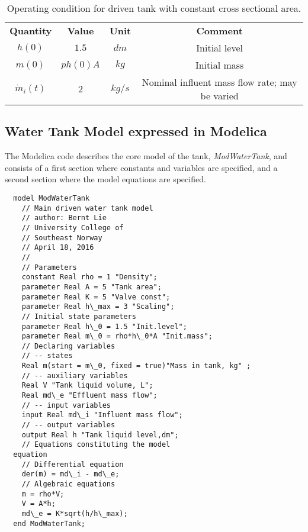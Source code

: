 \begin{table} [!h]
	\begin{center}
		\caption{Operating condition for driven tank with constant cross sectional area.} 
		\label{tab:tablemodeloperatingconditions} 
		\begin{tabular}{ cccc } 
			\hline
			\bfseries Quantity & \bfseries Value  & \bfseries Unit  & \bfseries Comment \\ 
			$h(0)$ & $1.5$ & $dm $ & Initial level \\ 
			$m(0)$ & $ph (0) A $ & $kg$ & Initial mass \\ 
			$\dot{m}_i (t)$ & $2$ & $kg/s$ & Nominal influent mass flow rate; may be varied \\
			\hline
		\end{tabular}
	\end{center}
\end{table}

\subsection{Water Tank Model expressed in Modelica}
\label{subsec:pythonmodleicamodel}

The Modelica code describes the core model of the tank, \textit{ModWaterTank}, and consists of a first section where
constants and variables are specified, and a second section where the model equations are specified.

\begin{lstlisting}
  model ModWaterTank 
    // Main driven water tank model 
    // author: Bernt Lie 
    // University College of 
    // Southeast Norway 
    // April 18, 2016 
    //
    // Parameters
    constant Real rho = 1 "Density";
    parameter Real A = 5 "Tank area";
    parameter Real K = 5 "Valve const";
    parameter Real h\_max = 3 "Scaling";
    // Initial state parameters
    parameter Real h\_0 = 1.5 "Init.level";
    parameter Real m\_0 = rho*h\_0*A "Init.mass";
    // Declaring variables
    // -- states
    Real m(start = m\_0, fixed = true)"Mass in tank, kg" ;
    // -- auxiliary variables
    Real V "Tank liquid volume, L";
    Real md\_e "Effluent mass flow";
    // -- input variables
    input Real md\_i "Influent mass flow";
    // -- output variables 
    output Real h "Tank liquid level,dm";
    // Equations constituting the model 
  equation 
    // Differential equation 
    der(m) = md\_i - md\_e; 
    // Algebraic equations 
    m = rho*V; 
    V = A*h;
    md\_e = K*sqrt(h/h\_max);
  end ModWaterTank;
\end{lstlisting}

